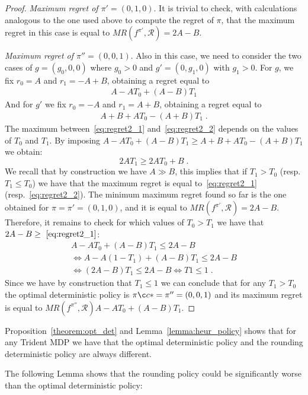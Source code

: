 \begin{proof}
\textit{Maximum regret of $\pi' = (0, 1, 0)$}.
It is trivial to check, with calculations analogous to the one used above to compute the regret of $\pi$, that the maximum regret in this case is equal to $MR(f^{\pi'}, \mathcal{R}) = 2A-B$.


\textit{Maximum regret of $\pi'' = (0, 0, 1)$}.
Also in this case, we need to consider the two cases of $g =(g_0, 0 ,0)$ where $g_0 > 0$ and $g' = (0, g_1, 0)$ with $g_1 > 0$. For $g$, we fix $r_0 = A$ and $r_1 = -A+B$, obtaining a regret equal to 
\begin{align}
A- A T_0 +(A-B) T_1 \label{eq:regret2_1}
\end{align}
And for $g'$ we fix $r_0 = -A$ and $r_1 = A+B$, obtaining a regret equal to 
\begin{align}
A+B+A T_0 -(A+B) T_1\;. \label{eq:regret2_2}
\end{align}
The maximum between~\eqref{eq:regret2_1} and~\eqref{eq:regret2_2} depends on the values of $T_0$ and $T_1$.
By imposing  $A- A T_0 +(A-B) T_1 \geq A+B+A T_0 -(A+B) T_1$ we obtain:
$$ 2A T_1 \geq 2 A T_0 + B\;. $$
We recall that by construction we have $A \gg B$, this implies that if $T_1> T_0$ (resp. $T_1\leq T_0$)  we have that the maximum regret is equal to~\eqref{eq:regret2_1} (resp.~\eqref{eq:regret2_2}).
The minimum maximum regret found so far is the one obtained for $\pi = \pi' = (0, 1, 0)$, and it is equal to $MR(f^{\pi'}, \mathcal{R}) = 2A-B$. Therefore, it remains to check for which values of $T_0 > T_1$ we have that $2A-B \geq~\eqref{eq:regret2_1}$:
\begin{align*}
A- A T_0 +(A-B) T_1 \leq 2A - B \\
 \Leftrightarrow A- A (1-T_1) +(A-B) T_1 \leq 2A - B\\
  \Leftrightarrow (2A-B)T_1 \leq 2A-B  \Leftrightarrow T1 \leq 1\;.
\end{align*}
 Since we have by construction that $T_1 \leq1$ we can conclude that for any $T_1> T_0$ the optimal deterministic policy is $\piç* = \pi''= (0, 0,1)$ and its maximum regret is equal to $MR(f^{\pi''}, \mathcal{R})A- A T_0 +(A-B) T_1$. 
\end{proof}

Proposition~\ref{theorem:opt_det} and Lemma~\ref{lemma:heur_policy} shows that for any Trident MDP we have that the optimal deterministic policy and the rounding deterministic policy are always different. 


The following Lemma shows that the rounding policy could be significantly worse than the optimal deterministic policy:

